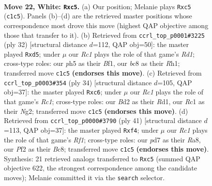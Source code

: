 \documentclass[11pt]{article}
\begin{document}
\clearpage

\begin{figure}[p]\centering
\begin{subfigure}{0.46\textwidth}\centering
\resizebox{\linewidth}{!}{%
\newchessgame
\chessboard[
  setfen={1rb2r2/p1pp1pk1/2n1p3/2q4p/6p1/5NP1/PP1BPP1P/2R1KB1R w - - 2 22},
  showmover=false,
  pgfstyle=straightmove, color=movearrow, markmove={c1-c5}
]}
\caption{}
\end{subfigure}\hfill
\begin{subfigure}{0.46\textwidth}\centering
\resizebox{\linewidth}{!}{%
\newchessgame
\chessboard[
  setfen={r1b1k2r/1p3ppp/p7/b2qp3/4n3/5PB1/PPP1N1PP/1K1R1B1R w kq - 0 17},
  showmover=false,
  pgfstyle=straightmove, color=movearrow, markmove={d1-d5}
]}
\caption{}
\end{subfigure}
\\[4pt]
\begin{subfigure}{0.46\textwidth}\centering
\resizebox{\linewidth}{!}{%
\newchessgame
\chessboard[
  setfen={r2r2k1/p1p2pp1/1pqbpn1p/8/3P1B2/P5P1/1P2PPNP/2RR2K1 w - - 0 18},
  showmover=false,
  pgfstyle=straightmove, color=movearrow, markmove={c1-c6}
]}
\caption{}
\end{subfigure}\hfill
\begin{subfigure}{0.46\textwidth}\centering
\resizebox{\linewidth}{!}{%
\newchessgame
\chessboard[
  setfen={r1b2rk1/1pp3bp/p2p4/3P4/2P2QP1/2NB4/PP5P/2KRR3 b - - 0 21},
  showmover=false,
  pgfstyle=straightmove, color=movearrow, markmove={f8-f4}
]}
\caption{}
\end{subfigure}
\caption{\textbf{Move 22, White: \texttt{Rxc5}.} (a) Our position; Melanie plays \texttt{Rxc5} (\texttt{c1c5}). Panels (b)--(d) are the retrieved master positions whose correspondence most drove this move (highest QAP objective among those that transfer to it). (b) Retrieved from \texttt{ccrl\_top\_p0001\#3225} (ply 32) [structural distance $d$=112, QAP obj=50]: the master played \texttt{Rxd5}; under $\mu$ our \emph{Rc1} plays the role of that game's \emph{Rd1}; cross-type roles: our \emph{p}h5 as their \emph{B}f1, our \emph{b}c8 as their \emph{R}h1; transferred move \texttt{c1c5} \textbf{(endorses this move)}. (c) Retrieved from \texttt{ccrl\_top\_p0003\#354} (ply 34) [structural distance $d$=105, QAP obj=37]: the master played \texttt{Rxc6}; under $\mu$ our \emph{Rc1} plays the role of that game's \emph{Rc1}; cross-type roles: our \emph{B}d2 as their \emph{R}d1, our \emph{R}c1 as their \emph{N}g2; transferred move \texttt{c1c5} \textbf{(endorses this move)}. (d) Retrieved from \texttt{ccrl\_top\_p0000\#3790} (ply 41) [structural distance $d$=113, QAP obj=37]: the master played \texttt{Rxf4}; under $\mu$ our \emph{Rc1} plays the role of that game's \emph{Rf1}; cross-type roles: our \emph{p}d7 as their \emph{R}a8, our \emph{P}f2 as their \emph{B}c8; transferred move \texttt{c1c5} \textbf{(endorses this move)}. Synthesis: 21 retrieved analogs transferred to \texttt{Rxc5} (summed QAP objective 622, the strongest correspondence among the candidate moves); Melanie committed it via the \texttt{search} selector.}
\label{fig:thought-m42}
\end{figure}
\end{document}
